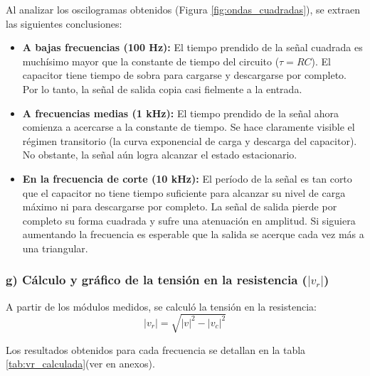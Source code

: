 \documentclass{article}
\begin{document}
                    Al analizar los oscilogramas obtenidos (Figura \ref{fig:ondas_cuadradas}), se extraen las siguientes conclusiones:
                    \begin{itemize}
                        \item \textbf{A bajas frecuencias (100 Hz):} El
                         tiempo prendido de la señal cuadrada es muchísimo
                          mayor que la constante de tiempo del circuito ($\tau = RC$).
                           El capacitor tiene tiempo de sobra para cargarse y descargarse por completo.
                            Por lo tanto, la señal de salida copia casi fielmente a la entrada.
                        \item \textbf{A frecuencias medias (1 kHz):} 
                        El tiempo prendido de la señal ahora comienza a 
                        acercarse a la constante de tiempo. Se hace claramente 
                        visible el régimen transitorio (la curva exponencial de carga y descarga 
                        del capacitor). No obstante, la señal aún logra alcanzar el estado estacionario.
                        \item \textbf{En la frecuencia de corte (10 kHz):} 
                        El período de la señal es tan corto que el capacitor no tiene tiempo
                         suficiente para alcanzar su nivel de carga máximo ni para descargarse
                          por completo. La señal de salida pierde por completo su forma cuadrada 
                          y sufre una atenuación en amplitud. Si siguiera aumentando la frecuencia es esperable que la salida se acerque cada vez más a una triangular.
                    \end{itemize}
                \subsubsection*{g) Cálculo y gráfico de la tensión en la resistencia ($|v_r|$)} \label{vr}
        
        A partir de los módulos medidos, se calculó la tensión en la resistencia:
        $$|v_r| = \sqrt{|v|^2 - |v_c|^2}$$
        
        Los resultados obtenidos para cada frecuencia se detallan en la tabla \ref{tab:vr_calculada}(ver en anexos). 
    
\end{document}

